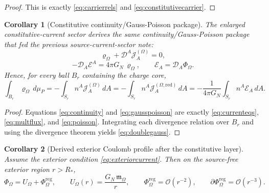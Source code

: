 \documentclass[11pt]{article}
\newcommand{\SpatialD}{\mathcal D}
\newcommand{\FlowPot}{\Phi_\Omega}
\newcommand{\FlowPotReg}{\Phi_\Omega^{\mathrm{reg}}}
\newcommand{\CoulPot}{U_\Omega}
\newcommand{\SourceDensity}{\varrho_\Omega}
\newcommand{\SourceCurrent}{\mathcal J^{(\Omega)}}
\newcommand{\SourceCurrentRed}{\mathcal J^{(\Omega,\mathrm{red})}}
\newcommand{\SourceFlux}{\mathcal E}
\newcommand{\HamChargeOmega}{\mathfrak m_\Omega}
\newtheorem{corollary}{Corollary}
\begin{document}
\begin{proof}
This is exactly \eqref{eq:carrierrels} and \eqref{eq:constitutivecarrier}.
\end{proof}

\begin{corollary}[Constitutive continuity/Gauss-Poisson package]
\label{cor:continuity}
The enlarged constitutive-current sector derives the same continuity/Gauss-Poisson package that fed the previous source-current-sector note:
\begin{equation}
\SourceDensity+\SpatialD^A\SourceCurrent_A=0,
\label{eq:continuity}
\end{equation}
\begin{equation}
-\SpatialD_A\SourceFlux^A=4\pi G_N\,\SourceDensity,
\qquad
\SourceFlux_A=\SpatialD_A\FlowPot.
\label{eq:gausspoisson}
\end{equation}
Hence, for every ball \(B_r\) containing the charge core,
\begin{equation}
\int_{B_r}\SourceDensity\,d\mu_P
=
-\int_{S_r}n^A\SourceCurrent_A\,dA
=
-\int_{S_r}n^A\SourceCurrentRed_A\,dA
=
-\frac{1}{4\pi G_N}\int_{S_r}n^A\SourceFlux_A\,dA.
\label{eq:doublegauss}
\end{equation}
\end{corollary}

\begin{proof}
Equations \eqref{eq:continuity} and \eqref{eq:gausspoisson} are exactly \eqref{eq:currenteqs}, \eqref{eq:multflux}, and \eqref{eq:poisson}. Integrating each divergence relation over \(B_r\) and using the divergence theorem yields \eqref{eq:doublegauss}.
\end{proof}

\begin{corollary}[Derived exterior Coulomb profile after the constitutive layer]
\label{cor:coulomb}
Assume the exterior condition \eqref{eq:exteriorcurrent}. Then on the source-free exterior region \(r>R_\ast\),
\begin{equation}
\FlowPot
=
\CoulPot+\FlowPotReg,
\qquad
\CoulPot(r)=\frac{G_N\,\HamChargeOmega}{r},
\qquad
\FlowPotReg=\mathcal O(r^{-2}),
\qquad
\partial\FlowPotReg=\mathcal O(r^{-3}).
\label{eq:potdecomp}
\end{equation}
\end{corollary}
\end{document}
